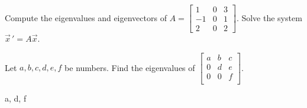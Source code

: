 \begin{exercise}\ansMark%
\leavevmode
\begin{tasks}
\task
Compute the eigenvalues and eigenvectors of
$A= \left[ \begin{smallmatrix}
1 & 0 & 3 \\
-1 & 0 & 1 \\
2 & 0 & 2
\end{smallmatrix}\right]$.
\task
Solve the system
$\vec{x}\,' = A \vec{x}$.
\end{tasks}
\end{exercise}

\begin{exercise}
Let $a,b,c,d,e,f$ be numbers.  Find the eigenvalues of
$\left[ \begin{smallmatrix}
a & b & c \\
0 & d & e \\
0 & 0 & f \\
\end{smallmatrix} \right]$.
\end{exercise}
\comboSol{%
}
{%
a, d, f
}

